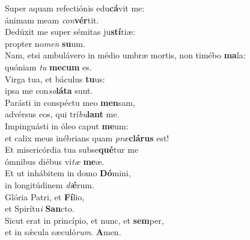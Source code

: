 \evenverse Super aquam refectiónis edu\textbf{cá}vit me:~\*\\
\evenverse ánimam meam \textit{con}\textbf{vér}tit.\\
\oddverse Dedúxit me super sémitas ju\textbf{stí}tiæ:~\*\\
\oddverse propter no\textit{men} \textbf{su}um.\\
\evenverse Nam, etsi ambulávero in médio umbræ mortis, non timébo \textbf{ma}la:~\*\\
\evenverse quóniam \textit{tu} \textbf{me}\textbf{cum} es.\\
\oddverse Virga tua, et báculus \textbf{tu}us:~\*\\
\oddverse ipsa me con\textit{so}\textbf{lá}\textbf{ta} sunt.\\
\evenverse Parásti in conspéctu meo \textbf{men}sam,~\*\\
\evenverse advérsus eos, qui trí\textit{bu}\textbf{lant} me.\\
\oddverse Impinguásti in óleo caput \textbf{me}um:~\*\\
\oddverse et calix meus inébrians quam \textit{præ}\textbf{clá}\textbf{rus} est!\\
\evenverse Et misericórdia tua subse\textbf{qué}tur me~\*\\
\evenverse ómnibus diébus vi\textit{tæ} \textbf{me}æ.\\
\oddverse Et ut inhábitem in domo \textbf{Dó}mini,~\*\\
\oddverse in longitúdinem \textit{di}\textbf{é}rum.\\
\evenverse Glória Patri, et \textbf{Fí}lio,~\*\\
\evenverse et Spirítu\textit{i} \textbf{San}cto.\\
\oddverse Sicut erat in princípio, et nunc, et \textbf{sem}per,~\*\\
\oddverse et in sǽcula sæculó\textit{rum}. \textbf{A}men.\\
